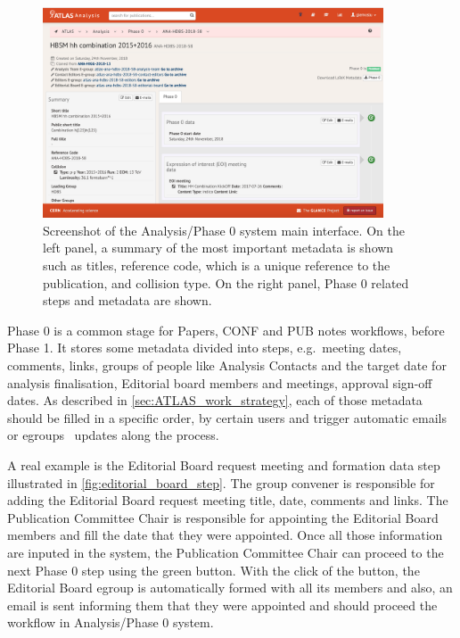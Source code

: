\begin{figure}[htb]
  \centering
  \includegraphics[width=0.9\textwidth]{figures/Glance_Papers_Phase0.png}
  \caption{Screenshot of the Analysis/Phase 0 system main interface. On the left panel, a summary of the most important metadata is shown such as titles, reference code, which is a unique reference to the publication, and collision type. On the right panel, Phase 0 related steps and metadata are shown.}%
  \label{fig:Glance_Papers_Phase0}
\end{figure}

Phase 0 is a common stage for Papers, CONF and PUB notes workflows, before Phase 1.
It stores some metadata divided into steps, e.g.\ meeting dates, comments, links, groups of people like Analysis Contacts and the target date for analysis finalisation, Editorial board members and meetings, approval sign-off dates.
As described in \cref{sec:ATLAS_work_strategy}, each of those metadata should be filled in a specific order, 
by certain users and trigger automatic emails or egroups~\cite{egroups} updates along the process.

A real example is the Editorial Board request meeting and formation data step illustrated in \cref{fig:editorial_board_step}. The group convener is responsible for adding the Editorial Board request meeting title, date, comments and links. The Publication Committee Chair is responsible for appointing the Editorial Board members and fill the date that they were appointed. Once all those information are inputed in the system, the Publication Committee Chair can proceed to the next Phase 0 step using the green button. With the click of the button, the Editorial Board egroup is automatically formed with all its members and also, an email is sent informing them that they were appointed and should proceed the workflow in Analysis/Phase 0 system.

